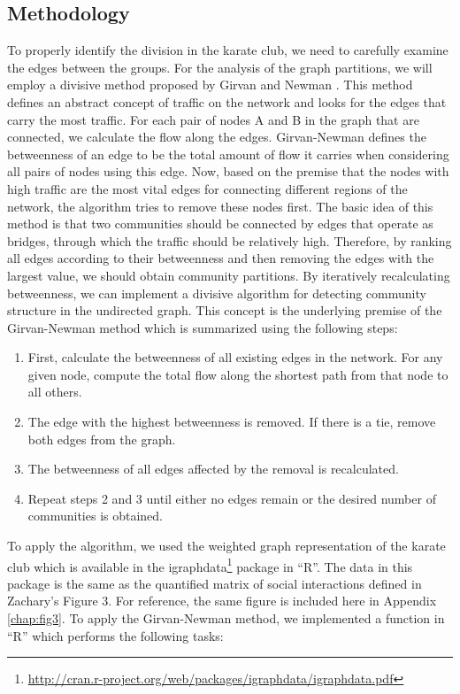 \documentclass[letterpaper,11pt]{report}
\begin{document}
\begin{savenotes}
\subsection{Methodology}To properly identify the division in the karate club, we need to carefully examine the edges between the groups. For the analysis of the graph partitions, we will employ a divisive method proposed by Girvan and Newman \cite{girvan2001community}. This method defines an abstract concept of traffic on the network and looks for the edges that carry the most traffic. For each pair of nodes A and B in the graph that are connected, we calculate the flow along the edges. Girvan-Newman defines the betweenness of an edge to be the total amount of flow it carries when considering all pairs of nodes using this edge.  Now, based on the premise that the nodes with high traffic are the most vital edges for connecting different regions of the network, the algorithm tries to remove these nodes first. The basic idea of this method is that two communities should be connected by edges that operate as bridges, through which the traffic should be relatively high. Therefore, by ranking all edges according to their betweenness and then removing the edges with the largest value, we should obtain community partitions. By iteratively recalculating betweenness, we can implement a divisive algorithm for detecting community structure in the undirected graph. This concept is the underlying premise of the Girvan-Newman method which is summarized using the following steps:

\begin{enumerate}
\item First, calculate the betweenness of all existing edges in the network. For any given node, compute the total flow along the shortest path from that node to all others.
\item The edge with the highest betweenness is removed. If there is a tie, remove both edges from the graph. 
\item The betweenness of all edges affected by the removal is recalculated.
\item Repeat steps 2 and 3 until either no edges remain or the desired number of communities is obtained.
\end{enumerate}

To apply the algorithm, we used the weighted graph representation of the karate club which is available in the igraphdata\footnote{\url{http://cran.r-project.org/web/packages/igraphdata/igraphdata.pdf}} package in ``R''. The data in this package is the same as the quantified matrix of social interactions defined in Zachary's\cite{zachary1977information} Figure 3. For reference, the same figure is included here in Appendix \ref{chap:fig3}. To apply the Girvan-Newman method, we implemented a function in ``R'' which performs the following tasks:


\end{savenotes}
\end{document}
